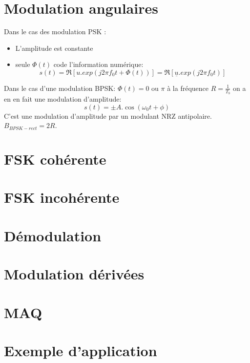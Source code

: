 \documentclass[main.tex]{subfiles}
\begin{document}
\section{Modulation angulaires}
\begin{prop}
  Dans le cas des modulation PSK :
  \begin{itemize}
  \item L'amplitude est constante
  \item seule $\Phi(t)$ code l'information numérique:
    \[
      s(t) = \Re\left[u.exp(j2\pi f_0 t+ \Phi(t))\right] = \Re\left[\underline{u}.exp(j2\pi f_0t)\right]\]
    
  \end{itemize}
\end{prop}
\begin{exemple}
  Dans le cas d'une modulation BPSK: $\Phi(t) = 0 \text{ ou }\pi $ à  la fréquence $R =\frac{1}{T_b}$ on a en en fait une modulation d'amplitude:
   \[
     s(t) = \pm A.\cos(\omega_0 t+\phi)
   \]
   C'est une modulation d'amplitude par un modulant NRZ antipolaire. $B_{BPSK-rect} = 2R$.
   
\end{exemple}
\section{FSK cohérente}
\section{FSK incohérente}
\section{Démodulation}

\section{Modulation dérivées}
\section{MAQ}
\section{Exemple d'application}
\end{document}

